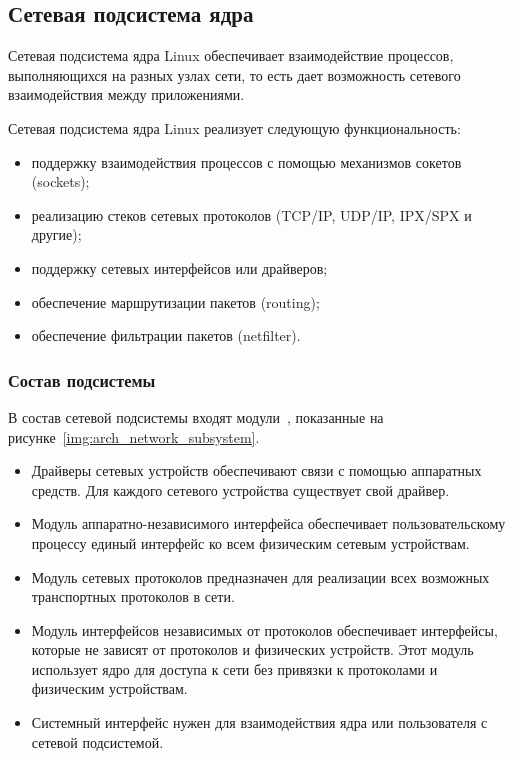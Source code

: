 \subsection{Сетевая подсистема ядра}

Сетевая подсистема ядра Linux \cite{moduls_kernel_linux, linux_network_internals} обеспечивает взаимодействие процессов, выполняющихся на разных узлах сети, то есть дает возможность сетевого взаимодействия между приложениями.

Сетевая подсистема ядра Linux реализует следующую функциональность:
\begin{itemize}
	\item поддержку взаимодействия процессов с помощью механизмов сокетов (sockets);
	\item реализацию стеков сетевых протоколов (TCP/IP, UDP/IP, IPX/SPX и другие);
	\item поддержку сетевых интерфейсов или драйверов;
	\item обеспечение маршрутизации пакетов (routing);
	\item обеспечение фильтрации пакетов (netfilter).
\end{itemize}

\subsubsection{Состав подсистемы}

В состав сетевой подсистемы входят модули~\cite{os_gostev}, показанные на рисунке~\ref{img:arch_network_subsystem}.

\begin{itemize}
	\item Драйверы сетевых устройств обеспечивают связи с помощью аппаратных средств.
	Для каждого сетевого устройства существует свой драйвер.
	\item Модуль аппаратно-независимого интерфейса обеспечивает пользовательскому процессу единый интерфейс ко всем физическим сетевым устройствам.
	\item Модуль сетевых протоколов предназначен для реализации всех возможных транспортных протоколов в сети.
	\item Модуль интерфейсов независимых от протоколов обеспечивает интерфейсы, которые не зависят от протоколов и физических устройств.
	Этот модуль использует ядро для доступа к сети без привязки к протоколами и физическим устройствам.
	\item Системный интерфейс нужен для взаимодействия ядра или пользователя с сетевой подсистемой.
\end{itemize}

